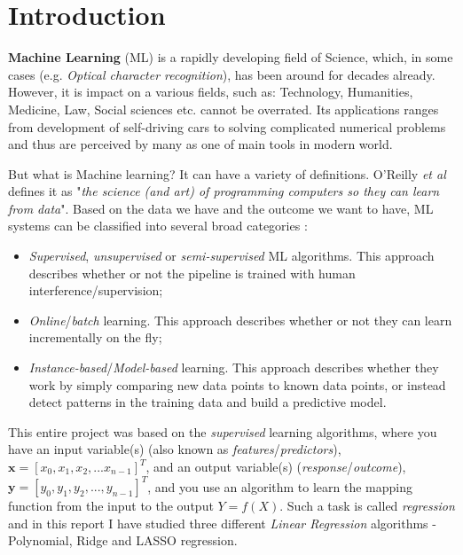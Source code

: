 \section{Introduction}
\label{introduction}






\textbf{Machine Learning} (ML) is a rapidly developing field of Science, which, in some cases (e.g. \textit{Optical character recognition}), has been around for decades already. However, it is impact on a various fields, such as: Technology, Humanities, Medicine, Law, Social sciences etc. cannot be overrated. Its applications ranges from development of self-driving cars to solving complicated numerical problems and thus are perceived by many as one of main tools in modern world. 

But what is Machine learning? It can have a variety of definitions. O'Reilly \textit{et al} \cite{Geron} defines it as "\textit{the science (and art) of programming computers so they can learn from data}". Based on the data we have and the outcome we want to have, ML systems can be classified into several broad categories \cite{Geron}: 
\begin{itemize}
    \item \textit{Supervised}, \textit{unsupervised} or \textit{semi-supervised} ML algorithms. This approach describes whether or not the pipeline is trained with human interference/supervision; 
    \item \textit{Online}/\textit{batch} learning. This approach describes whether or not they can learn incrementally on the fly;
    \item \textit{Instance-based}/\textit{Model-based} learning. This approach describes whether they work by simply comparing new data points to known data points, or instead detect patterns in the training data and build a predictive model.
\end{itemize}

This entire project was based on the \textit{supervised} learning algorithms, where you have an input variable(s) (also known as \textit{features}/\textit{predictors}), $\bm{x}=[x_0, x_1, x_2,...x_{n-1}]^T$, and an output variable(s) (\textit{response}/\textit{outcome}), $\bm{y}=[y_0, y_1, y_2,...,y_{n-1}]^T$, and you use an algorithm to learn the mapping function from the input to the output $Y = f(X)$. Such a task is called \textit{regression} and in this report I have studied three different \textit{Linear Regression} algorithms - Polynomial, Ridge and LASSO regression.

